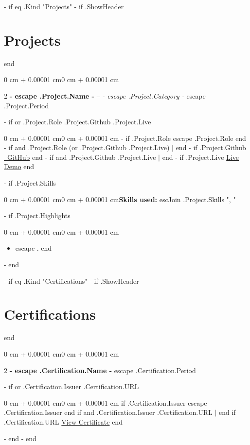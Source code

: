 \documentclass[10pt, a4paper]{article}
\newenvironment{highlights}{\begin{itemize}[topsep=0.10 cm,parsep=0.10 cm,partopsep=0pt,itemsep=0pt,leftmargin=0 cm + 10pt]}{\end{itemize}}
\newenvironment{onecolentry}{\begin{adjustwidth}{0 cm + 0.00001 cm}{0 cm + 0.00001 cm}}{\end{adjustwidth}}
\newenvironment{twocolentry}[2][]{\onecolentry\def\secondColumn{#2}\setcolumnwidth{\fill, 4.5 cm}\begin{paracol}{2}}{\switchcolumn \raggedleft \secondColumn\end{paracol}\endonecolentry}
\begin{document}
        {{- if eq .Kind "Projects" }}
            {{- if .ShowHeader }}\section{Projects}{{ end }}
            \begin{twocolentry}{
                {{ escape .Project.Period }}
            }
                \textbf{ {{- escape .Project.Name -}} } -- \textit{ {{- escape .Project.Category -}} }\end{twocolentry}
            {{- if or .Project.Role .Project.Github .Project.Live }}\vspace{0.10 cm}
            \begin{onecolentry}
                {{- if .Project.Role }}{{ escape .Project.Role }}{{ end }}
                {{- if and .Project.Role (or .Project.Github .Project.Live) }} $|$ {{ end }}
                {{- if .Project.Github }}\href{ {{ .Project.Github }} }{\faGithub\ GitHub}{{ end }}
                {{- if and .Project.Github .Project.Live }} $|$ {{ end }}
                {{- if .Project.Live }}\href{ {{ .Project.Live }} }{Live Demo}{{ end }}
            \end{onecolentry}{{ end }}
            {{- if .Project.Skills }}\vspace{0.10 cm}\begin{onecolentry}\textbf{Skills used:} {{ escJoin .Project.Skills ", " }}\end{onecolentry}{{ end }}
            {{- if .Project.Highlights }}\vspace{0.10 cm}\begin{onecolentry}\begin{highlights}{{ range .Project.Highlights }}\item {{ escape . }}{{ end }}\end{highlights}\end{onecolentry}{{ end }}
            \vspace{0.2 cm}
        {{- end }}

        {{- if eq .Kind "Certifications" }}
            {{- if .ShowHeader }}\section{Certifications}{{ end }}
            \begin{twocolentry}{
                {{ escape .Certification.Period }}
            }
                \textbf{ {{- escape .Certification.Name -}} }\end{twocolentry}
            {{- if or .Certification.Issuer .Certification.URL }}\vspace{0.10 cm}\begin{onecolentry}{{ if .Certification.Issuer }}{{ escape .Certification.Issuer }}{{ end }} {{ if and .Certification.Issuer .Certification.URL }} $|$ {{ end }} {{ if .Certification.URL }}\href{ {{ .Certification.URL }} }{View Certificate}{{ end }}\end{onecolentry}{{ end }}
            \vspace{0.2 cm}
        {{- end }}
    {{- end }}
\end{document}
